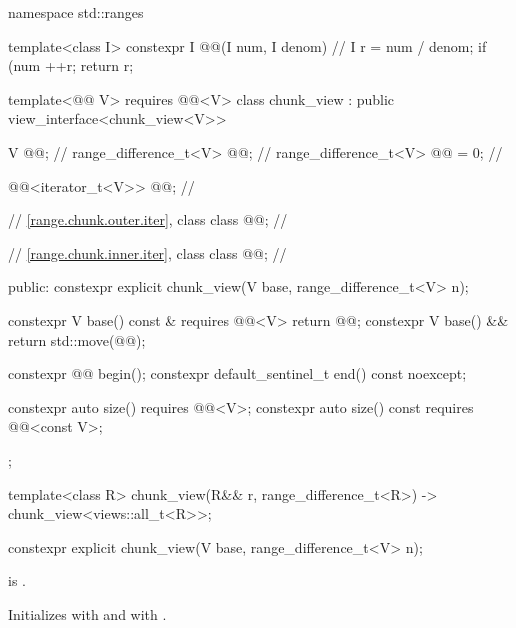 %
%
%
\begin{codeblock}
namespace std::ranges {
  template<class I>
  constexpr I @@(I num, I denom) {                  // \expos
    I r = num / denom;
    if (num %
      ++r;
    return r;
  }

  template<@@ V>
    requires @@<V>
  class chunk_view : public view_interface<chunk_view<V>> {
    V @@;                                              // \expos
    range_difference_t<V> @@;                             // \expos
    range_difference_t<V> @@ = 0;                 // \expos

    @@<iterator_t<V>> @@;       // \expos

    // \ref{range.chunk.outer.iter}, class 
    class @@;                                 // \expos

    // \ref{range.chunk.inner.iter}, class 
    class @@;                                 // \expos

  public:
    constexpr explicit chunk_view(V base, range_difference_t<V> n);

    constexpr V base() const & requires @@<V> { return @@; }
    constexpr V base() && { return std::move(@@); }

    constexpr @@ begin();
    constexpr default_sentinel_t end() const noexcept;

    constexpr auto size() requires @@<V>;
    constexpr auto size() const requires @@<const V>;
  };

  template<class R>
    chunk_view(R&& r, range_difference_t<R>) -> chunk_view<views::all_t<R>>;
}
\end{codeblock}

\begin{itemdecl}
constexpr explicit chunk_view(V base, range_difference_t<V> n);
\end{itemdecl}

\begin{itemdescr}
\pnum
\expects
{} is .

\pnum
\effects
Initializes  with  and
 with .
\end{itemdescr}

